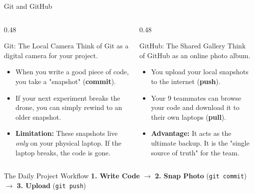 \begin{frame}{Git and GitHub}

\footnotesize

\begin{columns}[T,onlytextwidth]

    \begin{column}{0.48\textwidth}
        \begin{block}{Git: The Local Camera}
            Think of Git as a digital camera for your project.
            \begin{itemize}
                \setlength{\itemsep}{0.2em}
                \item When you write a good piece of code, you take a "snapshot" (\textbf{commit}).
                \item If your next experiment breaks the drone, you can simply rewind to an older snapshot.
                \item \textbf{Limitation:} These snapshots live \textit{only} on your physical laptop. If the laptop breaks, the code is gone.
            \end{itemize}
        \end{block}
    \end{column}

    \begin{column}{0.48\textwidth}
        \begin{exampleblock}{GitHub: The Shared Gallery}
            Think of GitHub as an online photo album.
            \begin{itemize}
                \setlength{\itemsep}{0.2em}
                \item You upload your local snapshots to the internet (\textbf{push}).
                \item Your 9 teammates can browse your code and download it to their own laptops (\textbf{pull}).
                \item \textbf{Advantage:} It acts as the ultimate backup. It is the "single source of truth" for the team.
            \end{itemize}
        \end{exampleblock}
    \end{column}

\end{columns}

\pause
\vspace{0.25cm}

\begin{alertblock}{The Daily Project Workflow}
    \centering
    \normalsize
    \textbf{1. Write Code} 
    \quad $\longrightarrow$ \quad 
    \textbf{2. Snap Photo} (\texttt{git commit}) 
    \quad $\longrightarrow$ \quad 
    \textbf{3. Upload} (\texttt{git push})
\end{alertblock}

\end{frame}

